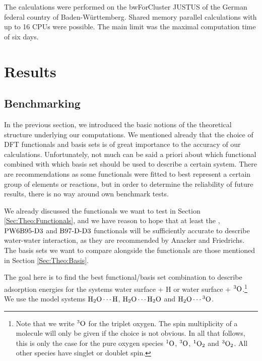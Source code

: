 The calculations were performed on the bwForCluster JUSTUS of the German
federal country of Baden-Württemberg.\cite{JUSTUS} Shared memory parallel
calculations with up to 16 CPUs were possible. The main limit was the maximal
computation time of six days.



\section{Results}
\label{Sec:Results}

\subsection{Benchmarking}
\newcommand\htohto{\mbox{\enmat{\hto \cdots \hto}}}
\newcommand\htoo{\mbox{\enmat{\hto \cdots \hspace{.2pt} ^3\te{O}}}}
\newcommand\htoh{\mbox{\enmat{\hto \cdots \te H}}}
\label{Sec:Bench}

In the previous section, we introduced the basic notions of the theoretical
structure underlying our computations. We mentioned already that the choice
of DFT functionals and basis sets is of great importance to the accuracy of our calculations. Unfortunately, not much can be said a priori about
which functional combined with which basis set should be used to describe a certain system.
There are recommendations as some functionals were fitted to best represent a certain
group of elements or reactions, but in order to determine the reliability of
future results, there is no way around own benchmark tests.

We already
discussed the functionals we want to test in Section \ref{Sec:Theo:Functionals}, and we
have reason to hope that at least the \pbez, $\text{PW6B95}\text{-D3}$ and $\text{B97-D}\text{-D3}$ functionals will be sufficiently
accurate to describe water-water interaction, as they are recommended by Anacker
and Friedrichs. \cite{Anacker2014} The basis sets we want to compare alongside
the functionals are those mentioned in Section \ref{Sec:Theo:Basis}.

The goal here is to find the best functional/basis set combination to describe
adsorption energies for the systems water surface + H or water surface +
${^3\text{O}}$.\footnote{Note that we write ${^3\text{O}}$ for the triplet oxygen. The spin
multiplicity of a molecule will only be given if the choice is not obvious. In all that
follows, this is only the case for the pure oxygen species ${^1\text{O}}$, ${^3\text{O}}$,
${^1\text O_2}$ and ${^3\text O_2}$. All other species have singlet or doublet spin.}
We use the model systems $\htoh$, $\htohto$ and $\htoo$.

